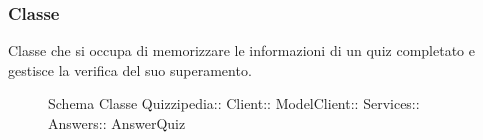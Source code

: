 \subsubsection{Classe }
Classe che si occupa di memorizzare le informazioni di un quiz completato e gestisce la verifica del suo superamento.
\begin{figure}[H]
\centering
\noindent{}
\caption[Schema Classe AnswerQuiz]{Schema Classe Quizzipedia:: Client:: ModelClient:: Services:: Answers:: AnswerQuiz}
\end{figure}
